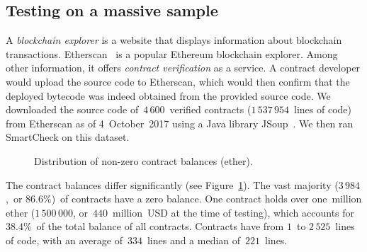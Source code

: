 \subsection{Testing on a massive sample} \label{MassiveTesting}

A \textit{blockchain explorer} is a website that displays information about blockchain transactions.
Etherscan~\cite{EtherscanVerified} is a popular Ethereum blockchain explorer.
Among other information, it offers \textit{contract verification} as a service.
A contract developer would upload the source code to Etherscan, which would then confirm that the deployed bytecode was indeed obtained from the provided source code.
We downloaded the source code of~$4\,600$~verified contracts ($1\,537\,954$~lines of code) from Etherscan as of 4~October~2017 using a Java library JSoup~\cite{JSoup}.
We then ran SmartCheck on this dataset.

\begin{figure}
	\centering
	\caption{Distribution of non-zero contract balances (ether).}
	\label{BalancesFigure}
\end{figure}

The contract balances differ significantly (see Figure~\ref{BalancesFigure}).
The vast majority ($3\,984$,~or $86.6\%$)~of contracts have a zero balance.
One contract holds over one~million ether ($1\,500\,000$, or~$440$~million~USD at the time of testing), which accounts for~$38.4\%$~of the total balance of all contracts.
Contracts have from $1$~to $2\,525$~lines of code, with an average of~$334$~lines and a median of~$221$~lines.

